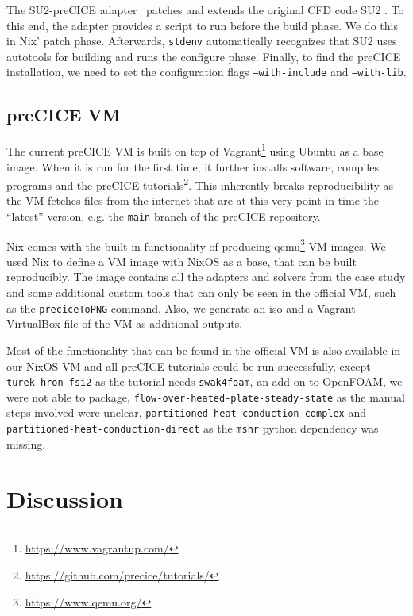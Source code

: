 \documentclass{eceasst}
\newcommand{\todo}[1]{\pdfcomment[color={0.045 0.278 0.643},icon=Note]{#1}}
\begin{document}
The SU2-preCICE adapter~\cite{Uekermann2017_Adapters} patches and extends the original CFD code SU2 \todo{cite SU2}.
To this end, the adapter provides a script to run before the build phase.
We do this in Nix' patch phase. Afterwards, \texttt{stdenv} automatically recognizes that SU2 uses autotools for building and runs the configure phase.
Finally, to find the preCICE installation, we need to set the configuration flags \texttt{--with-include} and \texttt{--with-lib}.

\subsection{preCICE VM}

The current preCICE VM is built on top of Vagrant\footnote{\url{https://www.vagrantup.com/}} using Ubuntu as a base image.
When it is run for the first time, it further installs software, compiles programs and the preCICE tutorials\footnote{\url{https://github.com/precice/tutorials/}}.
This inherently breaks reproducibility as the VM fetches files from the internet that are at this very point in time the ``latest'' version, e.g. the \texttt{main} branch of the preCICE repository.

Nix comes with the built-in functionality of producing qemu\footnote{\url{https://www.qemu.org/}} VM images.
We used Nix to define a VM image with NixOS as a base, that can be built reproducibly.
The image contains all the adapters and solvers from the case study and some additional custom tools that can only be seen in the official VM, such as the \texttt{preciceToPNG} command.
Also, we generate an iso and a Vagrant VirtualBox file of the VM as additional outputs.

\begin{sloppypar}
Most of the functionality that can be found in the official VM is also available in our NixOS VM and all preCICE tutorials could be run successfully, except \texttt{turek-hron-fsi2} as the tutorial needs \texttt{swak4foam}, an add-on to OpenFOAM, we were not able to package, \texttt{flow-over-heated-plate-steady-state} as the manual steps involved were unclear, \texttt{partitioned-heat-conduction-complex} and \texttt{partitioned-heat-conduction-direct} as the \texttt{mshr} python dependency was missing.
\end{sloppypar}

\section{Discussion}
\end{document}
